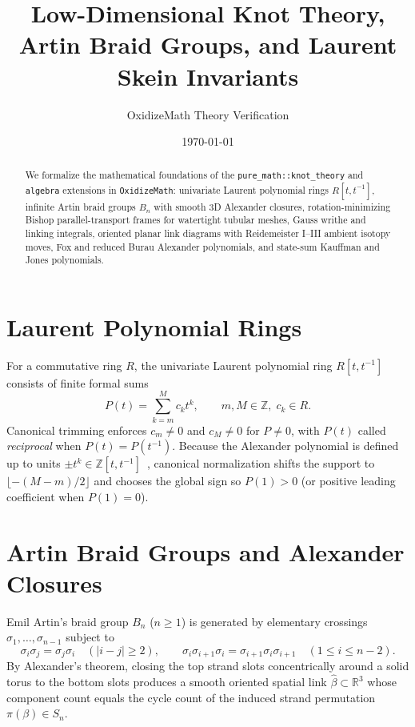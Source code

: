 \documentclass{article}
\title{Low-Dimensional Knot Theory, Artin Braid Groups, and Laurent Skein Invariants}
\author{OxidizeMath Theory Verification}
\date{\today}
\begin{document}
\maketitle

\begin{abstract}
We formalize the mathematical foundations of the \texttt{pure\_math::knot\_theory} and \texttt{algebra} extensions in \texttt{OxidizeMath}: univariate Laurent polynomial rings $R[t, t^{-1}]$, infinite Artin braid groups $B_n$ with smooth 3D Alexander closures, rotation-minimizing Bishop parallel-transport frames for watertight tubular meshes, Gauss writhe and linking integrals, oriented planar link diagrams with Reidemeister I--III ambient isotopy moves, Fox and reduced Burau Alexander polynomials, and state-sum Kauffman and Jones polynomials.
\end{abstract}

\section{Laurent Polynomial Rings}

For a commutative ring $R$, the univariate Laurent polynomial ring $R[t, t^{-1}]$ consists of finite formal sums
\[
P(t) = \sum_{k=m}^{M} c_k t^k, \qquad m, M \in \mathbb{Z}, \; c_k \in R.
\]
Canonical trimming enforces $c_m \neq 0$ and $c_M \neq 0$ for $P \neq 0$, with $P(t)$ called \emph{reciprocal} when $P(t) = P(t^{-1})$. Because the Alexander polynomial is defined up to units $\pm t^k \in \mathbb{Z}[t, t^{-1}]$~\cite{alexander1928topological}, canonical normalization shifts the support to $\lfloor -(M - m)/2 \rfloor$ and chooses the global sign so $P(1) > 0$ (or positive leading coefficient when $P(1) = 0$).

\section{Artin Braid Groups and Alexander Closures}

Emil Artin's braid group $B_n$ ($n \ge 1$) is generated by elementary crossings $\sigma_1, \dots, \sigma_{n-1}$ subject to~\cite{artin1947theory}
\[
\sigma_i \sigma_j = \sigma_j \sigma_i \quad (|i - j| \ge 2), \qquad
\sigma_i \sigma_{i+1} \sigma_i = \sigma_{i+1} \sigma_i \sigma_{i+1} \quad (1 \le i \le n - 2).
\]
By Alexander's theorem, closing the top strand slots concentrically around a solid torus to the bottom slots produces a smooth oriented spatial link $\hat{\beta} \subset \mathbb{R}^3$ whose component count equals the cycle count of the induced strand permutation $\pi(\beta) \in S_n$.
\end{document}
